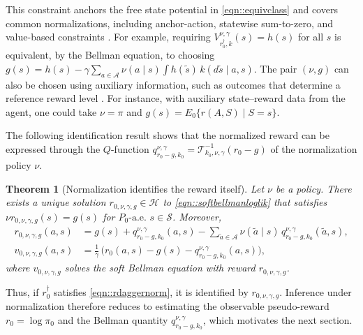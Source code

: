 \documentclass[12pt]{article}
\theoremstyle{plain}
\newtheorem{theorem}{Theorem}
\begin{document}
This constraint anchors the free state potential in \eqref{eqn::equivclass}
and covers common normalizations, including anchor-action, statewise
sum-to-zero, and value-based constraints
\citep{hotz1993conditional,bajari2010identification,
kallus2016revealed,geng2020deep}. For example, requiring
\(V_{r_0^\dagger,k}^{\nu,\gamma}(s)=h(s)\) for all \(s\) is equivalent, by the
Bellman equation, to choosing
\(g(s)=h(s)-\gamma\sum_{a\in\mathcal A}\nu(a\mid s)
\int h(\tilde s)\,k(d\tilde s\mid a,s)\).
The pair \((\nu,g)\) can also be chosen using auxiliary information, such as
outcomes that determine a reference reward level
\citep{kallus2018removing}. For instance, with auxiliary state--reward data
from the agent, one could take \(\nu=\pi\) and
\(g(s)=E_0\{r(A,S)\mid S=s\}\).


The following identification result shows that the normalized reward can be expressed
through the \(Q\)-function
\(q_{r_0-g,k_0}^{\nu,\gamma} = \mathcal{T}_{k_0,\nu,\gamma}^{-1}(r_0-g)\) of the
normalization policy \(\nu\).



\begin{theorem}[Normalization identifies the reward itself]
\label{theorem::identWithNormalization}
Let \(\nu\) be a policy.  
There exists a unique solution
\(r_{0,\nu,\gamma,g} \in \mathcal{H}\) 
to \eqref{eqn::softbellmanloglik}  that satisfies
\(\nu r_{0,\nu,\gamma,g}(s) = g(s)\) for \(P_0\text{-a.e.\ } s \in \mathcal{S}\).
Moreover,
\begin{align*}
    r_{0,\nu,\gamma,g}(a,s)
    &= g(s) + q_{r_0-g,k_0}^{\nu,\gamma}(a,s)
       - \sum_{\tilde a \in \mathcal{A}}
         \nu(\tilde a \mid s)\,
         q_{r_0-g,k_0}^{\nu,\gamma}(\tilde a,s), \\
    v_{0,\nu,\gamma,g}(a,s)
    &= \tfrac{1}{\gamma}\,\big(r_0(a,s) - g(s) - q_{r_0-g,k_0}^{\nu,\gamma}(a,s)\big),
\end{align*}
where  \(v_{0,\nu,\gamma,g}\) solves the soft Bellman equation with reward \(r_{0,\nu,\gamma,g}\). 
\end{theorem}

 


\noindent Thus, if \(r_0^\dagger\) satisfies \eqref{eqn::rdaggernorm}, it is
identified by \(r_{0,\nu,\gamma,g}\). Inference under normalization therefore
reduces to estimating the observable pseudo-reward \(r_0=\log\pi_0\) and the
Bellman quantity \(q_{r_0-g,k_0}^{\nu,\gamma}\), which motivates the next
section.
\end{document}
